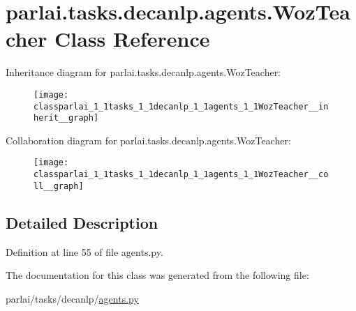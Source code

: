\hypertarget{classparlai_1_1tasks_1_1decanlp_1_1agents_1_1WozTeacher}{}\section{parlai.\+tasks.\+decanlp.\+agents.\+Woz\+Teacher Class Reference}
\label{classparlai_1_1tasks_1_1decanlp_1_1agents_1_1WozTeacher}


Inheritance diagram for parlai.\+tasks.\+decanlp.\+agents.\+Woz\+Teacher\+:
\nopagebreak
\begin{figure}[H]
\begin{center}
\leavevmode
\texttt{[image: classparlai\_1\_1tasks\_1\_1decanlp\_1\_1agents\_1\_1WozTeacher\_\_inherit\_\_graph]}
\end{center}
\end{figure}


Collaboration diagram for parlai.\+tasks.\+decanlp.\+agents.\+Woz\+Teacher\+:
\nopagebreak
\begin{figure}[H]
\begin{center}
\leavevmode
\texttt{[image: classparlai\_1\_1tasks\_1\_1decanlp\_1\_1agents\_1\_1WozTeacher\_\_coll\_\_graph]}
\end{center}
\end{figure}


\subsection{Detailed Description}


Definition at line 55 of file agents.\+py.



The documentation for this class was generated from the following file\+:\begin{DoxyCompactItemize}
\item 
parlai/tasks/decanlp/\hyperlink{parlai_2tasks_2decanlp_2agents_8py}{agents.\+py}\end{DoxyCompactItemize}
